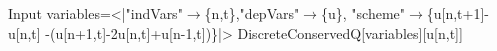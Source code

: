 \begin{mmaCell}[moredefined={variables, expression, DiscreteConservedQ}]{Input}
  variables=<|"indVars"\(\pmb{\to}\)\{n,t\},"depVars"\(\pmb{\to}\)\{u\},
  "scheme"\(\pmb{\to}\)\{u[n,t+1]-u[n,t]
  -(u[n+1,t]-2u[n,t]+u[n-1,t])\}|>
  DiscreteConservedQ[variables][u[n,t]]
  
\end{mmaCell}